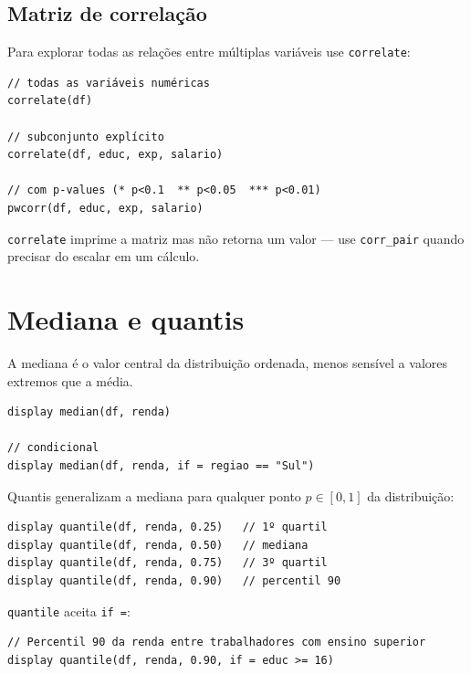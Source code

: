 \subsection{Matriz de correlação}

Para explorar todas as relações entre múltiplas variáveis use
\lstinline{correlate}:

\begin{lstlisting}[caption={Matriz de correlação completa}]
// todas as variáveis numéricas
correlate(df)

// subconjunto explícito
correlate(df, educ, exp, salario)

// com p-values (* p<0.1  ** p<0.05  *** p<0.01)
pwcorr(df, educ, exp, salario)
\end{lstlisting}

\begin{nota}
  \lstinline{correlate} imprime a matriz mas não retorna um valor — use
  \lstinline{corr_pair} quando precisar do escalar em um cálculo.
\end{nota}

\section{Mediana e quantis}

A mediana é o valor central da distribuição ordenada, menos sensível a valores
extremos que a média.

\begin{lstlisting}[caption={Mediana}]
display median(df, renda)

// condicional
display median(df, renda, if = regiao == "Sul")
\end{lstlisting}

Quantis generalizam a mediana para qualquer ponto $p \in [0, 1]$ da
distribuição:

\begin{lstlisting}[caption={Quantis}]
display quantile(df, renda, 0.25)   // 1º quartil
display quantile(df, renda, 0.50)   // mediana
display quantile(df, renda, 0.75)   // 3º quartil
display quantile(df, renda, 0.90)   // percentil 90
\end{lstlisting}

\lstinline{quantile} aceita \lstinline{if =}:

\begin{lstlisting}
// Percentil 90 da renda entre trabalhadores com ensino superior
display quantile(df, renda, 0.90, if = educ >= 16)
\end{lstlisting}


